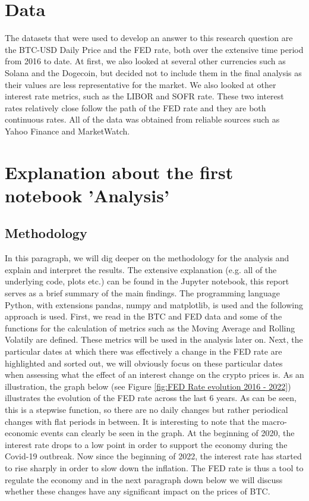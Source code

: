 \documentclass[12pt]{article}
\begin{document}
\section{Data}

The datasets that were used to develop an answer to this research question are the BTC-USD Daily Price and the FED rate, both over the extensive time period from 2016 to date. At first, we also looked at several other currencies such as Solana and the Dogecoin, but decided not to include them in the final analysis as their values are less representative for the market. We also looked at other interest rate metrics, such as the LIBOR and SOFR rate. These two interest rates relatively close follow the path of the FED rate and they are both continuous rates. All of the data was obtained from reliable sources such as Yahoo Finance and MarketWatch.



\section{Explanation about the first notebook 'Analysis'}
\subsection{Methodology}
In this paragraph, we will dig deeper on the methodology for the analysis and explain and interpret the results. The extensive explanation (e.g. all of the underlying code, plots etc.) can be found in the Jupyter notebook, this report serves as a brief summary of the main findings. \newline \newline
The programming language Python, with extensions pandas, numpy and matplotlib, is used and the following approach is used. First, we read in the BTC and FED data and some of the functions for the calculation of metrics such as the Moving Average and Rolling Volatily are defined. These metrics will be used in the analysis later on. Next, the particular dates at which there was effectively a change in the FED rate are highlighted and sorted out, we will obviously focus on these particular dates when assessing what the effect of an interest change on the crypto prices is. \newline
\newline As an illustration, the graph below (see Figure \ref{fig:FED Rate evolution 2016 - 2022}) illustrates the evolution of the FED rate across the last 6 years. As can be seen, this is a stepwise function, so there are no daily changes but rather periodical changes with flat periods in between. \newline It is interesting to note that the macro-economic events can clearly be seen in the graph. At the beginning of 2020, the interest rate drops to a low point in order to support the economy during the Covid-19 outbreak. Now since the beginning of 2022, the interest rate has started to rise sharply in order to slow down the inflation. The FED rate is thus a tool to regulate the economy and in the next paragraph down below we will discuss whether these changes have any significant impact on the prices of BTC.
\end{document}
